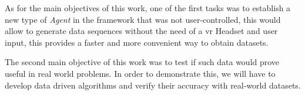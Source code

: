 As for the main objectives of this work, one of the first tasks was to establish a new type of \textit{Agent} in the framework that was not user-controlled, this would allow to generate data sequences without the need of a \gls{vr} Headset and user input, this 
provides a faster and more convenient way to obtain datasets.

The second main objective of this work was to test if such data would prove useful in real world problems. In order to demonstrate this, we will have to develop data driven algorithms and verify their accuracy with real-world datasets.

